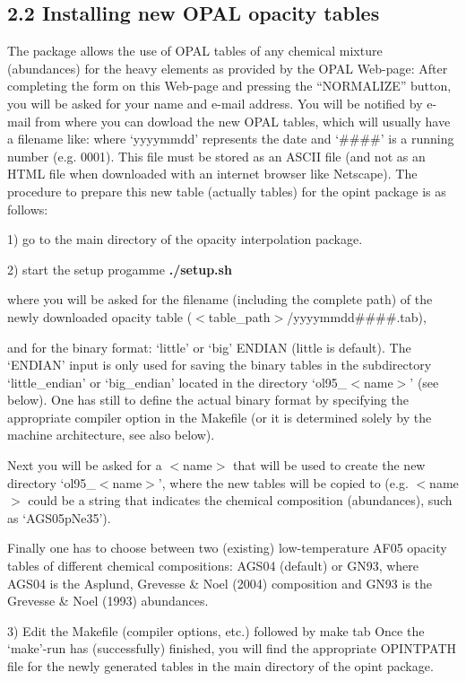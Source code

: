 \subsection{2.2 Installing new OPAL opacity tables}
The package allows the use of OPAL tables of any chemical mixture (abundances) for the 
heavy elements as provided by the OPAL Web-page:
\medskip
{} 
\medskip
After completing the form on this Web-page and pressing the ``NORMALIZE'' button, you 
will be asked for your name and e-mail address. You will be notified by e-mail from 
where you can dowload the new OPAL tables, which will usually have a filename like:
\medskip 
{}
\medskip 
where `yyyymmdd' represents the date and `\#\#\#\#' is a running number (e.g. 0001). This file
must be stored as an ASCII file (and not as an HTML file when downloaded with an internet
browser like Netscape). The procedure to prepare this new table (actually tables) for the
opint package is as follows:
\itemize{1cm}
\item{1)} go to the main directory of the opacity interpolation package.
\item{2)} start the setup progamme
\itemitem{\qquad} {\bf ./setup.sh}
\item{\phantom{2}} where you will be asked for the filename (including the complete path) 
                   of the newly downloaded opacity table 
                   ($<$table\_path$>$/yyyymmdd\#\#\#\#.tab),
\item{\phantom{2}} and for the binary format: `little' or `big' ENDIAN (little 
                   is default).  The `ENDIAN' input is only used for saving 
                   the binary tables in the subdirectory `little\_endian' or 
                   `big\_endian' located in the directory `ol95\_$<$name$>$'
                   (see below). One has still to define the actual binary 
                   format by specifying the appropriate compiler option in the 
                   Makefile (or it is determined solely by the machine 
                   architecture, see also below).
\item{\phantom{2}} Next you will be asked for a $<$name$>$ that will be used 
                   to create the new directory `ol95\_$<$name$>$', where 
                   the new tables will be copied to (e.g. $<$name$>$ could be 
                   a string that indicates the chemical composition 
                   (abundances), such as `AGS05pNe35').
\item{\phantom{2}} Finally one has to choose between two (existing) 
                   low-temperature AF05 opacity tables of different chemical 
                   compositions: AGS04 (default) or GN93, where AGS04 is the 
                   Asplund, Grevesse \& Noel (2004) composition and GN93 is 
                   the Grevesse \& Noel (1993) abundances. 
\item{3)} Edit the Makefile (compiler options, etc.) followed by
\itemitem{} make tab
\enditemize
\bigskip
Once the `make'-run has (successfully) finished, you will find the appropriate 
OPINTPATH file for the newly generated tables in the main directory 
of the opint package.

